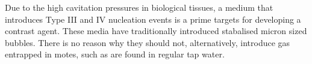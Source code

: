 Due to the high cavitation pressures in biological tissues,
a medium that introduces Type III and IV nucleation events is a prime targets for developing a contrast agent.
These media have traditionally introduced stabalised micron sized bubbles.
There is no reason why they should not, alternatively, introduce gas entrapped in motes,
such as are found in regular tap water.







